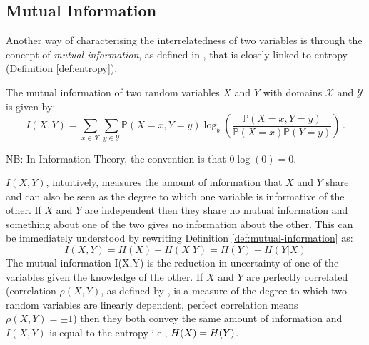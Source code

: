 \subsection{Mutual Information} \label{subsec:mutual-information}
Another way of characterising the interrelatedness of two variables is through the concept of \textit{mutual information}, as defined in \citet{Cover2006}, that is closely linked to entropy (Definition \ref{def:entropy}).
\begin{definition}
	The mutual information of two random variables $X$ and $Y$ with domains $\mathcal{X}$ and $\mathcal{Y}$ is given by:
	\begin{equation*} \label{def:mutual-information}
		I(X,Y) = \sum\limits_{x \in \mathcal{X}} \sum\limits_{y \in \mathcal{Y}} \mathbb{P}(X=x,Y=y) \log_{b} \left( \frac{\mathbb{P}(X=x,Y=y)}{\mathbb{P}(X=x) \mathbb{P}(Y=y)} \right) \,.
	\end{equation*}
\end{definition}
NB: In Information Theory, the convention is that $0 \log(0) = 0$.

$I(X,Y)$, intuitively, measures the amount of information that $X$ and $Y$ share and can also be seen as the degree to which one variable is informative of the other.
If $X$ and $Y$ are independent then they share no mutual information and something about one of the two gives no information about the other.
This can be immediately understood by rewriting Definition \ref{def:mutual-information} as:
\begin{equation}
	I(X,Y) = H(X) - H(X|Y) = H(Y) - H(Y|X)
\end{equation}
The mutual information I(X,Y) is the reduction in uncertainty of one of the variables given the knowledge of the other.
If $X$ and $Y$ are perfectly correlated (correlation $\rho(X,Y)$, as defined by \citet{Stolp2006}, is a measure of the degree to which two random variables are linearly dependent, perfect correlation means $\rho(X,Y)= \pm 1$) then they both convey the same amount of information and $I(X,Y)$ is equal to the entropy i.e., $H(X) = H(Y)$.


